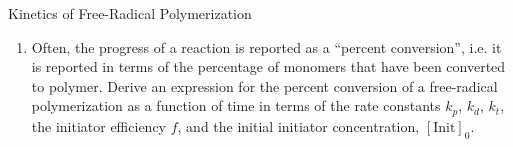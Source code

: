 \begin{activity}{Kinetics of Free-Radical Polymerization}
\begin{exercises}
\begin{enumerate}
			\item Often, the progress of a reaction is reported as a ``percent conversion'', i.e. it is reported in terms of the percentage of monomers that have been converted to polymer.  Derive an expression for the percent conversion of a free-radical polymerization as a function of time in terms of the rate constants $k_p$, $k_d$, $k_t$, the initiator efficiency $f$, and the initial initiator concentration, $[\text{Init}]_0$.
			
				\begin{solution}\end{solution}
		\end{enumerate}
		


	
\end{exercises}



%
%	


	
\end{activity}